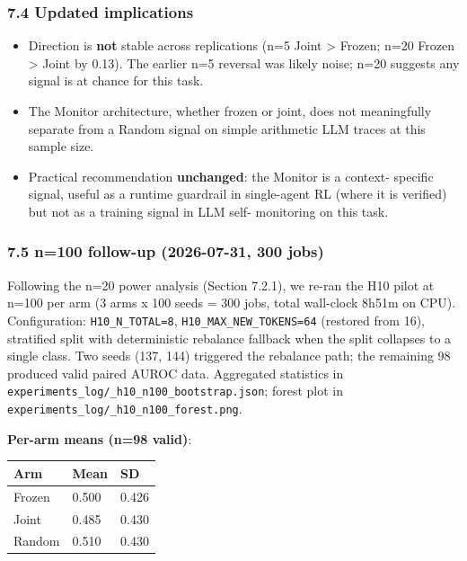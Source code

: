 \documentclass[
]{article}
\newcounter{none} %
\providecommand{\tightlist}{%
  \setlength{\itemsep}{0pt}\setlength{\parskip}{0pt}}
\begin{document}
\subsubsection{7.4 Updated implications}\label{updated-implications}

\begin{itemize}
\tightlist
\item
  Direction is \textbf{not} stable across replications (n=5 Joint
  \textgreater{} Frozen; n=20 Frozen \textgreater{} Joint by 0.13). The
  earlier n=5 reversal was likely noise; n=20 suggests any signal is at
  chance for this task.
\item
  The Monitor architecture, whether frozen or joint, does not
  meaningfully separate from a Random signal on simple arithmetic LLM
  traces at this sample size.
\item
  Practical recommendation \textbf{unchanged}: the Monitor is a context-
  specific signal, useful as a runtime guardrail in single-agent RL
  (where it is verified) but not as a training signal in LLM self-
  monitoring on this task.
\end{itemize}

\subsubsection{7.5 n=100 follow-up (2026-07-31, 300
jobs)}\label{n100-follow-up-2026-07-31-300-jobs}

Following the n=20 power analysis (Section 7.2.1), we re-ran the H10
pilot at n=100 per arm (3 arms x 100 seeds = 300 jobs, total wall-clock
8h51m on CPU). Configuration: \texttt{H10\_N\_TOTAL=8},
\texttt{H10\_MAX\_NEW\_TOKENS=64} (restored from 16), stratified split
with deterministic rebalance fallback when the split collapses to a
single class. Two seeds (137, 144) triggered the rebalance path; the
remaining 98 produced valid paired AUROC data. Aggregated statistics in
\texttt{experiments\_log/\_h10\_n100\_bootstrap.json}; forest plot in
\texttt{experiments\_log/\_h10\_n100\_forest.png}.

\textbf{Per-arm means (n=98 valid)}:

{\def\LTcaptype{none} %
\begin{longtable}[]{@{}lll@{}}
\toprule\noalign{}
Arm & Mean & SD \\
\midrule\noalign{}
\endhead
\bottomrule\noalign{}
\endlastfoot
Frozen & 0.500 & 0.426 \\
Joint & 0.485 & 0.430 \\
Random & 0.510 & 0.430 \\
\end{longtable}
}
\end{document}
